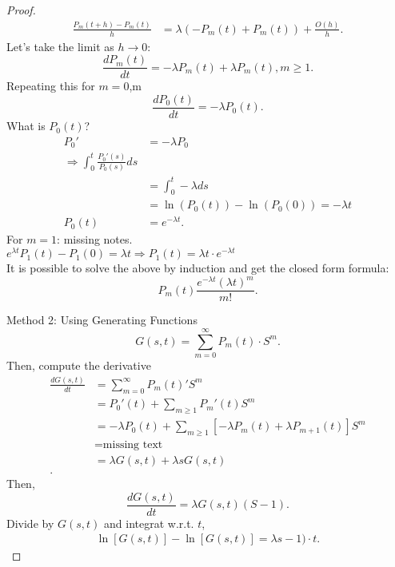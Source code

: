 \documentclass[a4paper]{article}
\begin{document}
\begin{proof}
\begin{align*}
     \frac{P_m (t + h) - P_m (t)}{h} &= \lambda (- P_{m} (t) + P_m (t)) + \frac{O(h)}{h}  
    .\end{align*}
    Let's take the limit as $h \to 0$:
     \[
    \frac{d P_{m} (t)}{dt} = - \lambda P_{m} (t) + \lambda P_{m} (t), m \geq 1
    .\] 
    Repeating this for $m = 0$,m 
     \[
    \frac{d P_0 (t)}{dt} = - \lambda P_0 (t)
    .\]
    What is $P_0 (t)$?
     \begin{align*}
       P_0' &= -\lambda P_0 \\
      \Rightarrow \int_{0}^{t} \frac{P_{0}' (s)}{P_{0} (s)} ds \\
            &= \int_{0}^{t}  -\lambda ds \\
            &=  \ln(P_0(t)) - \ln(P_0(0)) = - \lambda t \\
       P_0(t) &= e^{-\lambda t} 
    .\end{align*}
    For $m=1$:
    missing notes.\\

     $e^{\lambda t} P_{1} (t) - P_{1} \left(0 \right)  = \lambda t \Rightarrow P_1 (t) = \lambda t \cdot e^{ -\lambda t}$ \\
     It is possible to solve the above by induction and get the closed form formula:
     \[
       P_{m}(t) \frac{e^{-\lambda t} (\lambda t)^{m}}{m!}
     .\] 

     \noindent\hrulefill

     Method 2: Using Generating Functions\\
     \[
     G(s,t) = \sum_{m=0}^{\infty} P_{m} (t) \cdot S^{m}
     .\] 
     Then, compute the derivative 
     \begin{align*}
       \frac{d G(s,t)}{dt} &= \sum_{m=0}^{\infty} P_m (t)' S^{m} \\
                           &= P_0'(t) + \sum_{m \geq 1} P_{m}'(t) S^{m}  \\
                           &= - \lambda P_{0}(t) + \sum_{m \geq 1} [ - \lambda P_{m} (t) + \lambda P_{m+1} (t)] S^{m} \\ 
                           &= \text{missing text}  \\
                           &= \lambda G(s,t) + \lambda s G(s,t) \\
     .\end{align*}
     Then,
     \[
     \frac{d G(s,t)}{dt} = \lambda G(s,t) (S-1)
     .\] 
     Divide by $G(s,t)$ and integrat w.r.t.  $t$,
      \begin{align*}
        \ln[G(s,t)] - \ln[G(s,t)] = \lambda s-1) \cdot t
     .\end{align*}


\end{proof}
\end{document}
